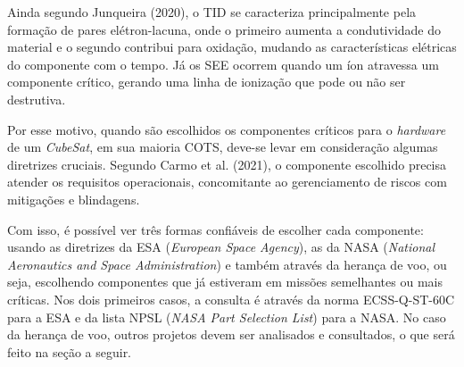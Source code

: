 Ainda segundo Junqueira (2020), o TID se caracteriza principalmente pela formação de pares elétron-lacuna, onde o primeiro aumenta a condutividade do material e o segundo contribui para oxidação, mudando as características elétricas do componente com o tempo.  Já os SEE ocorrem quando um íon atravessa um componente crítico, gerando uma linha de ionização que pode ou não ser destrutiva. 

Por esse motivo, quando são escolhidos os componentes críticos para o \textit{hardware} de um \textit{CubeSat}, em sua maioria COTS, deve-se levar em consideração algumas diretrizes cruciais. Segundo Carmo et al. (2021), o componente escolhido precisa atender os requisitos operacionais, concomitante ao gerenciamento de riscos com mitigações e blindagens. 

Com isso, é possível ver três formas confiáveis de escolher cada componente: usando as diretrizes da ESA (\textit{European Space Agency}), as da NASA (\textit{National Aeronautics and Space Administration}) e também através da herança de voo, ou seja, escolhendo componentes que já estiveram em missões semelhantes ou mais críticas. Nos dois primeiros casos, a consulta é através da norma ECSS-Q-ST-60C para a ESA e da lista NPSL (\textit{NASA Part Selection List}) para a NASA.  No caso da herança de voo, outros projetos devem ser analisados e consultados, o que será feito na seção a seguir.






